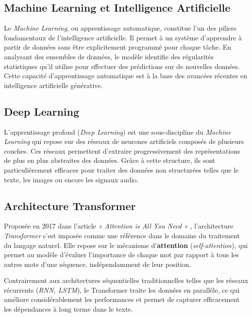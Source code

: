 
\subsection{Machine Learning et Intelligence Artificielle}

Le \textit{Machine Learning}, ou apprentissage automatique, constitue l’un des piliers fondamentaux de l’intelligence artificielle. Il permet à un système d’apprendre à partir de données sans être explicitement programmé pour chaque tâche. En analysant des ensembles de données, le modèle identifie des régularités statistiques qu’il utilise pour effectuer des prédictions sur de nouvelles données. Cette capacité d’apprentissage automatique est à la base des avancées récentes en intelligence artificielle générative.


\subsection{Deep Learning}

L’apprentissage profond (\textit{Deep Learning}) est une sous-discipline du \textit{Machine Learning} qui repose sur des réseaux de neurones artificiels composés de plusieurs couches. Ces réseaux permettent d’extraire progressivement des représentations de plus en plus abstraites des données. Grâce à cette structure, ils sont particulièrement efficaces pour traiter des données non structurées telles que le texte, les images ou encore les signaux audio.


\subsection{Architecture Transformer}

Proposée en 2017 dans l’article \textit{« Attention is All You Need »} \cite{vaswani2017attention}, l’architecture \textit{Transformer} s’est imposée comme une référence dans le domaine du traitement du langage naturel. Elle repose sur le mécanisme d’\textbf{attention} (\textit{self-attention}), qui permet au modèle d’évaluer l’importance de chaque mot par rapport à tous les autres mots d’une séquence, indépendamment de leur position.

Contrairement aux architectures séquentielles traditionnelles telles que les réseaux récurrents (\textit{RNN, LSTM}), le Transformer traite les données en parallèle, ce qui améliore considérablement les performances et permet de capturer efficacement les dépendances à long terme dans le texte.

